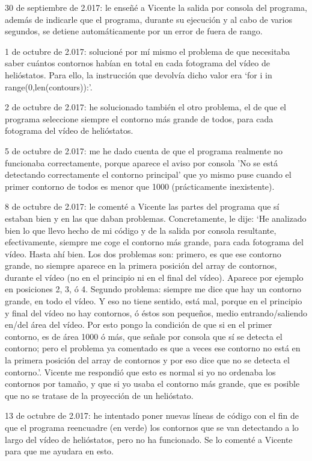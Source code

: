 \documentclass[12pt]{article}
\begin{document}
30 de septiembre de 2.017: le enseñé a Vicente la salida por consola del programa, además de indicarle que el programa, durante su ejecución y al cabo de varios segundos, se detiene automáticamente por un error de fuera de rango.

1 de octubre de 2.017: solucioné por mí mismo el problema de que necesitaba saber cuántos contornos habían en total en cada fotograma del vídeo de helióstatos. Para ello, la instrucción que devolvía dicho valor era ‘for i in range(0,len(contours)):’.

2 de octubre de 2.017: he solucionado también el otro problema, el de que el programa seleccione siempre el contorno más grande de todos, para cada fotograma del vídeo de helióstatos.

5 de octubre de 2.017: me he dado cuenta de que el programa realmente no funcionaba correctamente, porque aparece el aviso por consola 'No se está detectando correctamente el contorno principal' que yo mismo puse cuando el primer contorno de todos es menor que 1000 (prácticamente inexistente).

8 de octubre de 2.017: le comenté a Vicente las partes del programa que sí estaban bien y en las que daban problemas. Concretamente, le dije: ‘He analizado bien lo que llevo hecho de mi código y de la salida por consola resultante, efectivamente, siempre me coge el contorno más grande, para cada fotograma del vídeo. Hasta ahí bien. Los dos problemas son: primero, es que ese contorno grande, no siempre aparece en la primera posición del array de contornos, durante el vídeo (no en el principio ni en el final del vídeo). Aparece por ejemplo en posiciones 2, 3, ó 4. Segundo problema: siempre me dice que hay un contorno grande, en todo el vídeo. Y eso no tiene sentido, está mal, porque en el principio y final del vídeo no hay contornos, ó éstos son pequeños, medio entrando/saliendo en/del área del vídeo. Por esto pongo la condición de que si en el primer contorno, es de área 1000 ó más, que señale por consola que sí se detecta el contorno; pero el problema ya comentado es que a veces ese contorno no está en la primera posición del array de contornos y por eso dice que no se detecta el contorno.’. Vicente me respondió que esto es normal si yo no ordenaba los contornos por tamaño, y que si yo usaba el contorno más grande, que es posible que no se tratase de la proyección de un helióstato.

13 de octubre de 2.017: he intentado poner nuevas líneas de código con el fin de que el programa reencuadre (en verde) los contornos que se van detectando a lo largo del vídeo de helióstatos, pero no ha funcionado. Se lo comenté a Vicente para que me ayudara en esto.
\end{document}
